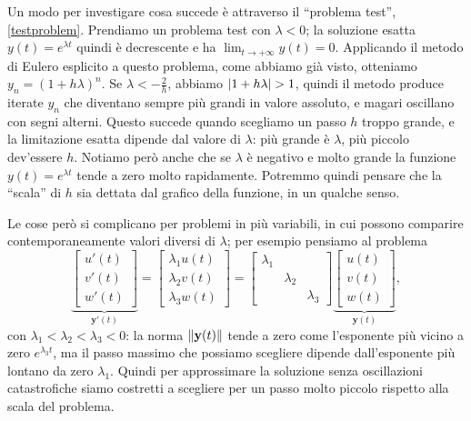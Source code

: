 \documentclass[a4paper]{report}
\DeclarePairedDelimiter{\abs}{\lvert}{\rvert}
\DeclarePairedDelimiter{\norm}{\lVert}{\rVert}
\theoremstyle{definiton}
\theoremstyle{remark}
\newcommand{\y}{\mathbf{y}}
\begin{document}
Un modo per investigare cosa succede è attraverso il ``problema test'', \eqref{testproblem}. Prendiamo un problema test con $\lambda < 0$; la soluzione esatta $y(t) = e^{\lambda t}$ quindi è decrescente e ha $\lim_{t\to+\infty} y(t) = 0$. Applicando il metodo di Eulero esplicito a questo problema, come abbiamo già visto, otteniamo $y_n = (1+h\lambda)^n$. Se $\lambda < -\frac{2}{h}$, abbiamo $\abs{1+h\lambda} > 1$, quindi il metodo produce iterate $y_n$ che diventano sempre più grandi in valore assoluto, e magari oscillano con segni alterni. Questo succede quando scegliamo un passo $h$ troppo grande, e la limitazione esatta dipende dal valore di $\lambda$: più grande è $\lambda$, più piccolo dev'essere $h$. Notiamo però anche che se $\lambda$ è negativo e molto grande la funzione $y(t) = e^{\lambda t}$ tende a zero molto rapidamente. Potremmo quindi pensare che la ``scala'' di $h$ sia dettata dal grafico della funzione, in un qualche senso.

Le cose però si complicano per problemi in più variabili, in cui possono comparire contemporaneamente valori diversi di $\lambda$; per esempio pensiamo al problema
\[
\underbrace{
\begin{bmatrix}
    u'(t)\\
    v'(t)\\
    w'(t)
\end{bmatrix}}_{\y'(t)} = \begin{bmatrix}
    \lambda_1 u(t)\\
    \lambda_2 v(t)\\
    \lambda_3 w(t)
\end{bmatrix} = \begin{bmatrix}
    \lambda_1 \\ 
    & \lambda_2\\
    && \lambda_3
\end{bmatrix} \underbrace{\begin{bmatrix}
    u(t)\\ v(t)\\ w(t)
\end{bmatrix}}_{\y(t)},
\]
con $\lambda_1 < \lambda_2 < \lambda_3 < 0$: la norma $\norm{\y(t)}$ tende a zero come l'esponente più vicino a zero $e^{\lambda_3 t}$, ma il passo massimo che possiamo scegliere dipende dall'esponente più lontano da zero $\lambda_1$. Quindi per approssimare la soluzione senza oscillazioni catastrofiche siamo costretti a scegliere per un passo molto piccolo rispetto alla scala del problema.
\end{document}
